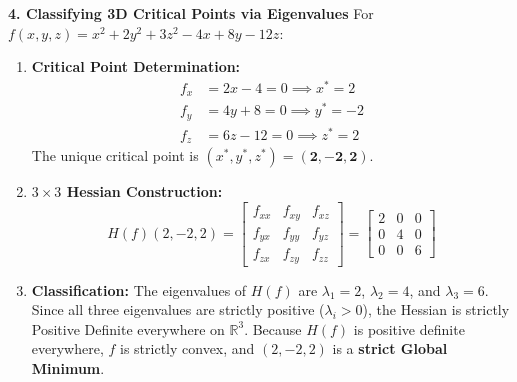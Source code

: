 \textbf{4. Classifying 3D Critical Points via Eigenvalues}
For $f(x, y, z) = x^2 + 2y^2 + 3z^2 - 4x + 8y - 12z$:
\begin{enumerate}
    \item \textbf{Critical Point Determination:}
    \begin{align*}
    f_x &= 2x - 4 = 0 \implies x^* = 2 \\
    f_y &= 4y + 8 = 0 \implies y^* = -2 \\
    f_z &= 6z - 12 = 0 \implies z^* = 2
    \end{align*}
    The unique critical point is $(x^*, y^*, z^*) = \mathbf{(2, -2, 2)}$.
    \item \textbf{$3 \times 3$ Hessian Construction:}
    \begin{equation*}
    H(f)(2, -2, 2) = \begin{bmatrix}
    f_{xx} & f_{xy} & f_{xz} \\
    f_{yx} & f_{yy} & f_{yz} \\
    f_{zx} & f_{zy} & f_{zz}
    \end{bmatrix} = \begin{bmatrix}
    2 & 0 & 0 \\
    0 & 4 & 0 \\
    0 & 0 & 6
    \end{bmatrix}
    \end{equation*}
    \item \textbf{Classification:}
    The eigenvalues of $H(f)$ are $\lambda_1 = 2$, $\lambda_2 = 4$, and $\lambda_3 = 6$.
    Since all three eigenvalues are strictly positive ($\lambda_i > 0$), the Hessian is strictly Positive Definite everywhere on $\mathbb{R}^3$.
    Because $H(f)$ is positive definite everywhere, $f$ is strictly convex, and $(2, -2, 2)$ is a \textbf{strict Global Minimum}.
\end{enumerate}

